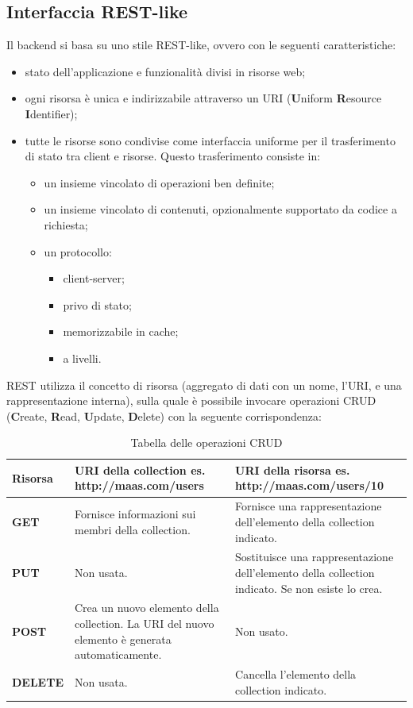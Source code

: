 \subsection{Interfaccia REST-like}
Il backend si basa su uno stile REST-like, ovvero con le seguenti caratteristiche:
\begin{itemize}
\item stato dell'applicazione e funzionalità divisi in risorse web;
\item ogni risorsa è unica e indirizzabile attraverso un URI (\textbf{U}niform \textbf{R}esource \textbf{I}dentifier);
\item tutte le risorse sono condivise come interfaccia uniforme per il trasferimento di stato tra client e risorse. Questo trasferimento consiste in:
\begin{itemize}
\item un insieme vincolato di operazioni ben definite;
\item un insieme vincolato di contenuti, opzionalmente supportato da codice a richiesta;
\item un protocollo:
\begin{itemize}
\item client-server;
\item privo di stato;
\item memorizzabile in cache;
\item a livelli.
\end{itemize}
\end{itemize}
\end{itemize}
REST utilizza il concetto di risorsa (aggregato di dati con un nome, l'URI, e una rappresentazione interna), sulla quale è possibile invocare operazioni CRUD (\textbf{C}reate, \textbf{R}ead, \textbf{U}pdate, \textbf{D}elete) con la seguente corrispondenza:
\begin{table}[H]
\centering
\label{CRUD}
\begin{tabular}{| >{\centering}p{3cm} | >{\centering}p{5cm} | >{\centering}p{6cm} |}
\hline
\textbf{Risorsa} & \textbf{URI della collection} \newline es. http://maas.com/users & \textbf{URI della risorsa} \newline es. http://maas.com/users/10 \tabularnewline \hline
\textbf{GET} & Fornisce informazioni sui membri della collection. & Fornisce una rappresentazione dell'elemento della collection indicato. \tabularnewline \hline
\textbf{PUT} & Non usata. & Sostituisce una rappresentazione dell'elemento della collection indicato. Se non esiste lo crea.  \tabularnewline \hline
\textbf{POST} & Crea un nuovo elemento della collection. La URI del nuovo elemento è generata automaticamente. & Non usato. \tabularnewline \hline
\textbf{DELETE} & Non usata. & Cancella l'elemento della collection indicato. \tabularnewline \hline
\end{tabular}
\caption{Tabella delle operazioni CRUD}
\end{table}
